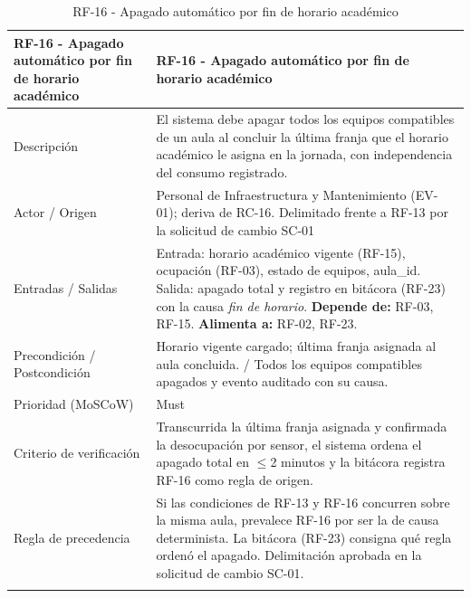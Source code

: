 \begingroup
\small
\begin{longtable}{|P{0.5000}|P{0.5000}|}
\hline
RF-16 - Apagado automático por fin de horario académico & RF-16 - Apagado automático por fin de horario académico \\ \hline
Descripción & El sistema debe apagar todos los equipos compatibles de un aula al concluir la última franja que el horario académico le asigna en la jornada, con independencia del consumo registrado. \\ \hline
Actor / Origen & Personal de Infraestructura y Mantenimiento (EV-01); deriva de RC-16. Delimitado frente a RF-13 por la solicitud de cambio SC-01 \\ \hline
Entradas / Salidas & Entrada: horario académico vigente (RF-15), ocupación (RF-03), estado de equipos, aula\_id. Salida: apagado total y registro en bitácora (RF-23) con la causa \emph{fin de horario}. \textbf{Depende de:} RF-03, RF-15. \textbf{Alimenta a:} RF-02, RF-23. \\ \hline
Precondición / Postcondición & Horario vigente cargado; última franja asignada al aula concluida. / Todos los equipos compatibles apagados y evento auditado con su causa. \\ \hline
Prioridad (MoSCoW) & Must \\ \hline
Criterio de verificación & Transcurrida la última franja asignada y confirmada la desocupación por sensor, el sistema ordena el apagado total en $\leq$2 minutos y la bitácora registra RF-16 como regla de origen. \\ \hline
Regla de precedencia & Si las condiciones de RF-13 y RF-16 concurren sobre la misma aula, prevalece RF-16 por ser la de causa determinista. La bit\'acora (RF-23) consigna qu\'e regla orden\'o el apagado. Delimitaci\'on aprobada en la solicitud de cambio SC-01. \\ \hline
\caption{RF-16 - Apagado automático por fin de horario académico}
\end{longtable}
\endgroup

